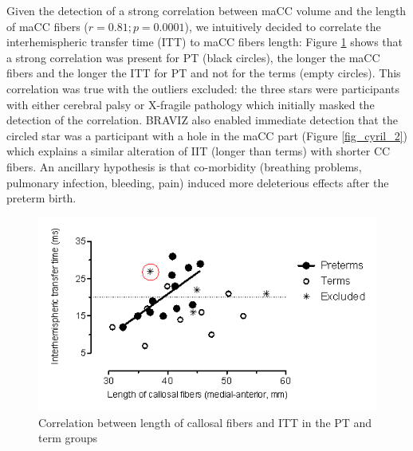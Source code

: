 \documentclass[twocolumn]{svjour3}
\begin{document}

Given the detection of a strong correlation between maCC volume and the length of maCC fibers ($r=0.81; p=0.0001$), we intuitively decided to correlate the interhemispheric transfer time (ITT) to maCC fibers length: Figure \ref{fig_cyril_1} shows that a strong correlation was present for PT (black circles), the longer the maCC fibers and the longer the ITT for PT and not for the terms (empty circles). This correlation was true with the outliers excluded: the three stars were participants with either cerebral palsy or X-fragile pathology which initially masked the detection of the correlation. BRAVIZ also enabled  immediate detection that the circled star was a participant with a hole in the maCC part (Figure \ref{fig_cyril_2}) which explains a similar alteration of IIT (longer than terms) with shorter CC fibers. An ancillary hypothesis is that co-morbidity (breathing problems, pulmonary infection, bleeding, pain) induced more deleterious effects after the preterm birth.

\begin{figure}
	\centering
		\includegraphics[width=\linewidth]{cyril_plot}
	\caption{Correlation between length of callosal fibers and ITT in the PT and term groups}
	\label{fig_cyril_1}
\end{figure}
\end{document}
